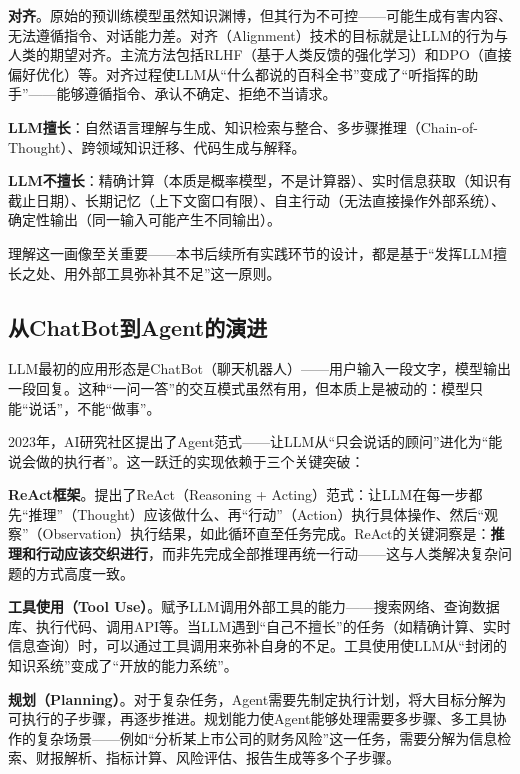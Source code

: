 \textbf{对齐}。原始的预训练模型虽然知识渊博，但其行为不可控——可能生成有害内容、无法遵循指令、对话能力差。对齐（Alignment）技术的目标就是让LLM的行为与人类的期望对齐。主流方法包括RLHF（基于人类反馈的强化学习）和DPO（直接偏好优化）等。对齐过程使LLM从``什么都说的百科全书''变成了``听指挥的助手''——能够遵循指令、承认不确定、拒绝不当请求。

\begin{theorybox}[LLM的“能力—局限”画像]
\textbf{LLM擅长}：自然语言理解与生成、知识检索与整合、多步骤推理（Chain-of-Thought）、跨领域知识迁移、代码生成与解释。

\textbf{LLM不擅长}：精确计算（本质是概率模型，不是计算器）、实时信息获取（知识有截止日期）、长期记忆（上下文窗口有限）、自主行动（无法直接操作外部系统）、确定性输出（同一输入可能产生不同输出）。

理解这一画像至关重要——本书后续所有实践环节的设计，都是基于``发挥LLM擅长之处、用外部工具弥补其不足''这一原则。
\end{theorybox}

\subsection{从ChatBot到Agent的演进}

LLM最初的应用形态是ChatBot（聊天机器人）——用户输入一段文字，模型输出一段回复。这种``一问一答''的交互模式虽然有用，但本质上是被动的：模型只能``说话''，不能``做事''。

2023年，AI研究社区提出了Agent范式——让LLM从``只会说话的顾问''进化为``能说会做的执行者''。这一跃迁的实现依赖于三个关键突破：

\textbf{ReAct框架}。\textcite{yao2023react}提出了ReAct（Reasoning + Acting）范式：让LLM在每一步都先``推理''（Thought）应该做什么、再``行动''（Action）执行具体操作、然后``观察''（Observation）执行结果，如此循环直至任务完成。ReAct的关键洞察是：\textbf{推理和行动应该交织进行}，而非先完成全部推理再统一行动——这与人类解决复杂问题的方式高度一致。

\textbf{工具使用（Tool Use）}。赋予LLM调用外部工具的能力——搜索网络、查询数据库、执行代码、调用API等。当LLM遇到``自己不擅长''的任务（如精确计算、实时信息查询）时，可以通过工具调用来弥补自身的不足。工具使用使LLM从``封闭的知识系统''变成了``开放的能力系统''。

\textbf{规划（Planning）}。对于复杂任务，Agent需要先制定执行计划，将大目标分解为可执行的子步骤，再逐步推进。规划能力使Agent能够处理需要多步骤、多工具协作的复杂场景——例如``分析某上市公司的财务风险''这一任务，需要分解为信息检索、财报解析、指标计算、风险评估、报告生成等多个子步骤。

